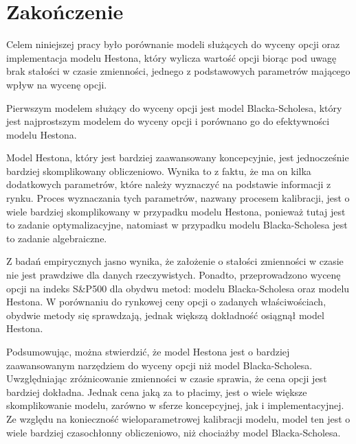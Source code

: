 \documentclass{pracamgr}
\begin{document}
 \chapter*{Zakończenie}\label{r:ending}

Celem niniejszej pracy było porównanie modeli służących do wyceny
opcji oraz implementacja modelu Hestona, który wylicza wartość opcji biorąc
pod uwagę brak stałości w czasie zmienności, jednego z podstawowych parametrów
mającego wpływ na wycenę opcji. 

Pierwszym modelem służący do wyceny opcji jest model Blacka-Scholesa, który jest
najprostszym modelem do wyceny opcji i porównano go do efektywności modelu 
Hestona. 

Model Hestona, który jest bardziej zaawansowany koncepcyjnie, jest jednocześnie 
bardziej skomplikowany obliczeniowo. Wynika to z faktu, że ma on kilka dodatkowych
parametrów, które należy wyznaczyć na podstawie informacji z rynku. Proces wyznaczania tych 
parametrów, nazwany procesem kalibracji, jest o wiele bardziej skomplikowany w przypadku 
modelu Hestona, ponieważ tutaj jest to zadanie optymalizacyjne, natomiast w przypadku modelu
Blacka-Scholesa jest to zadanie algebraiczne.


Z badań empirycznych jasno wynika, że założenie o stałości zmienności w czasie nie jest 
prawdziwe dla danych rzeczywistych. Ponadto, przeprowadzono wycenę opcji na indeks 
S\&P500 dla obydwu metod: modelu Blacka-Scholesa oraz modelu Hestona. 
W porównaniu do rynkowej ceny opcji o zadanych właściwościach, obydwie metody się 
sprawdzają, jednak większą dokładność osiągnął model Hestona.


Podsumowując, można stwierdzić, że model Hestona jest o bardziej zaawansowanym
narzędziem do wyceny opcji niż model Blacka-Scholesa. Uwzględniając zróżnicowanie zmienności 
w czasie sprawia, że cena opcji jest bardziej dokładna. Jednak cena jaką za to płacimy,
jest o wiele większe skomplikowanie modelu, zarówno w sferze koncepcyjnej, jak i 
implementacyjnej. Ze względu na konieczność wieloparametrowej kalibracji modelu, 
model ten jest o wiele bardziej czasochłonny obliczeniowo, niż chociażby model Blacka-Scholesa.


\appendix

\listoffigures 
{} 
 
\listoflistings 



\printbibliography
\printindex
 
\end{document}
